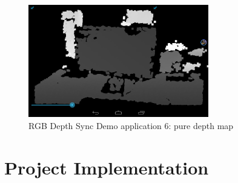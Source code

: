 \documentclass[12pt,twoside]{article}
\begin{document}
\begin{figure}[h]
    \centering
    \includegraphics[width=0.7\textwidth]{figures/rgbd6}
    \caption{RGB Depth Sync Demo application 6: pure depth map}
    \label{fig: rgbd6}
\end{figure}


\newpage

\section{Project Implementation}
\end{document}
